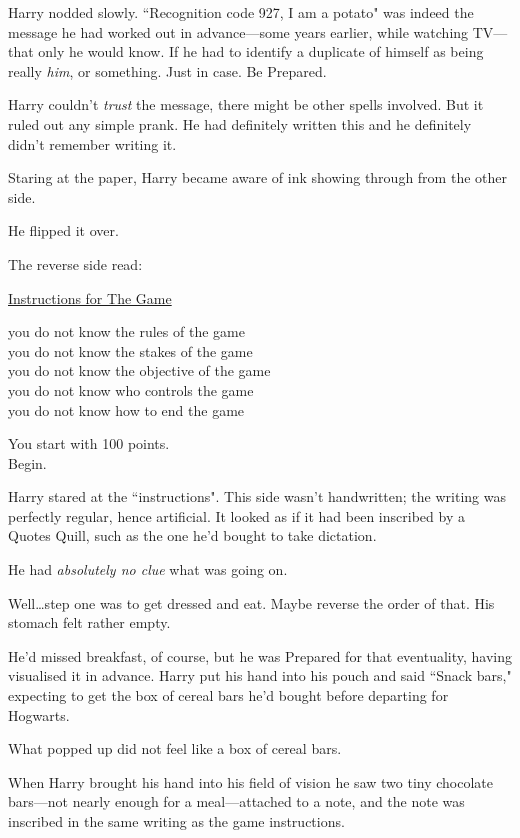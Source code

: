 Harry nodded slowly. ``Recognition code 927, I am a potato" was indeed the message he had worked out in advance—some years earlier, while watching TV—that only he would know. If he had to identify a duplicate of himself as being really \emph{him}, or something. Just in case. Be Prepared.

Harry couldn't \emph{trust} the message, there might be other spells involved. But it ruled out any simple prank. He had definitely written this and he definitely didn't remember writing it.

Staring at the paper, Harry became aware of ink showing through from the other side.

He flipped it over.

The reverse side read:

\begin{writtenNote}
\underline{Instructions for The Game}

you do not know the rules of the game\\
you do not know the stakes of the game\\
you do not know the objective of the game\\
you do not know who controls the game\\
you do not know how to end the game

You start with 100 points.\\
Begin.
\end{writtenNote}

Harry stared at the ``instructions". This side wasn't handwritten; the writing was perfectly regular, hence artificial. It looked as if it had been inscribed by a Quotes Quill, such as the one he'd bought to take dictation.

He had \emph{absolutely no clue} what was going on.

Well…step one was to get dressed and eat. Maybe reverse the order of that. His stomach felt rather empty.

He'd missed breakfast, of course, but he was Prepared for that eventuality, having visualised it in advance. Harry put his hand into his pouch and said ``Snack bars," expecting to get the box of cereal bars he'd bought before departing for Hogwarts.

What popped up did not feel like a box of cereal bars.

When Harry brought his hand into his field of vision he saw two tiny chocolate bars—not nearly enough for a meal—attached to a note, and the note was inscribed in the same writing as the game instructions.

